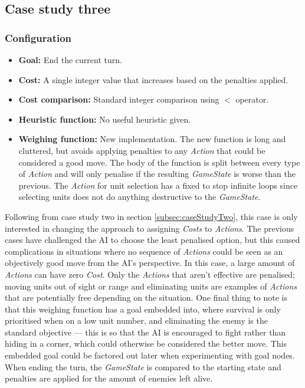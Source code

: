 \documentclass[11pt, a4paper]{report}
\begin{document}
\subsection{Case study three}
\label{subsec:caseStudyThree}

\subsubsection{Configuration}

\begin{itemize}
  \item \textbf{Goal:} End the current turn.
  \item \textbf{Cost:} A single integer value that increases based on the penalties applied.
  \item \textbf{Cost comparison:} Standard integer comparison using $<$ operator.
  \item \textbf{Heuristic function:} No useful heuristic given.
  \item \textbf{Weighing function:} New implementation. The new function is long and cluttered, but avoids applying penalties to any \emph{Action} that could be considered a good move. The body of the function is split between every type of \emph{Action} and will only penalise if the resulting \emph{GameState} is worse than the previous. The \emph{Action} for unit selection has a fixed to stop infinite loops since selecting units does not do anything destructive to the \emph{GameState}.
\end{itemize}

Following from case study two in section \ref{subsec:caseStudyTwo}, this case is only interested in changing the approach to assigning \emph{Costs} to \emph{Actions}. The previous cases have challenged the AI to choose the least penalised option, but this caused complications in situations where no sequence of \emph{Actions} could be seen as an objectively good move from the AI's perspective. In this case, a large amount of \emph{Actions} can have zero \emph{Cost}. Only the \emph{Actions} that aren't effective are penalised; moving units out of sight or range and eliminating units are examples of \emph{Actions} that are potentially free depending on the situation. One final thing to note is that this weighing function has a goal embedded into, where survival is only prioritised when on a low unit number, and eliminating the enemy is the standard objective --- this is so that the AI is encouraged to fight rather than hiding in a corner, which could otherwise be considered the better move. This embedded goal could be factored out later when experimenting with goal nodes. When ending the turn, the \emph{GameState} is compared to the starting state and penalties are applied for the amount of enemies left alive. 
\end{document}
